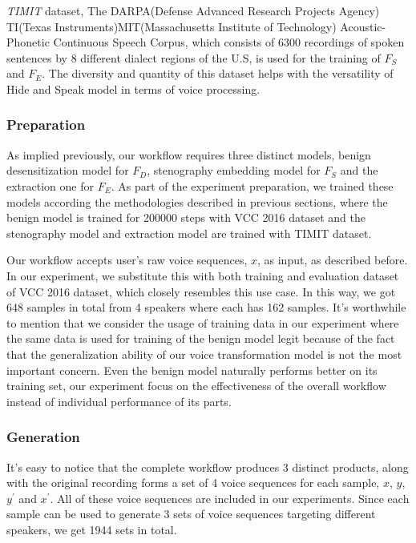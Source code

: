 \documentclass[conference]{IEEEtran}
\begin{document}
\textit{TIMIT} dataset, The DARPA(Defense Advanced Research Projects Agency) TI(Texas Instruments)MIT(Massachusetts Institute of Technology) Acoustic-Phonetic Continuous Speech Corpus, which consists of 6300 recordings of spoken sentences by 8 different dialect regions of the U.S, is used for the training of $F_S$ and $F_E$. The diversity and quantity of this dataset helps with the versatility of Hide and Speak model in terms of voice processing.

\subsubsection{Preparation}

As implied previously, our workflow requires three distinct models, benign desensitization model for $F_D$, stenography embedding model for $F_S$ and the extraction one for $F_E$. As part of the experiment preparation, we trained these models according the methodologies described in previous sections, where the benign model is trained for 200000 steps with VCC 2016 dataset and the stenography model and extraction model are trained with TIMIT dataset.

Our workflow accepts user's raw voice sequences, $x$, as input, as described before. In our experiment, we substitute this with both training and evaluation dataset of VCC 2016 dataset, which closely resembles this use case. In this way, we got 648 samples in total from 4 speakers where each has 162 samples. It's worthwhile to mention that we consider the usage of training data in our experiment where the same data is used for training of the benign model legit because of the fact that the generalization ability of our voice transformation model is not the most important concern. Even the benign model naturally performs better on its training set, our experiment focus on the effectiveness of the overall workflow instead of individual performance of its parts.

\subsubsection{Generation}

It's easy to notice that the complete workflow produces 3 distinct products, along with the original recording forms a set of 4 voice sequences for each sample, $x$, $y$, $y^{\prime}$ and $x^{\prime}$. All of these voice sequences are included in our experiments. Since each sample can be used to generate 3 sets of voice sequences targeting different speakers, we get 1944 sets in total.
\end{document}
